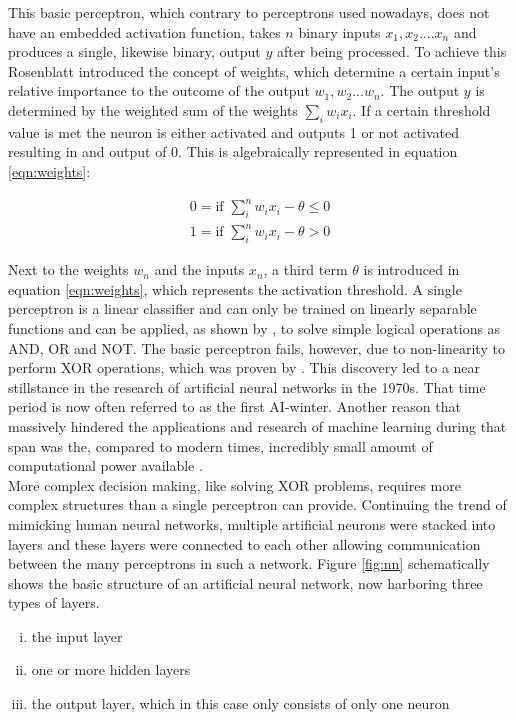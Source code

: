 This basic perceptron, which contrary to perceptrons used nowadays, does not have an
embedded activation function, takes $n$ binary inputs $x_1 , x_2 .... x_n$ and produces a
single, likewise binary, output $y$ after being processed. To achieve this Rosenblatt
introduced the concept of weights, which determine a certain input's relative importance
to the outcome of the output $w_1 , w_2 ... w_n$. The output $y$ is determined by the
weighted sum of the weights $\sum_i w_ix_i $. If a certain threshold value is met the
neuron is either activated and outputs 1 or not activated resulting in and output of
0. This is algebraically represented in equation \ref{eqn:weights}:

\begin{subequations}
 \begin{align}
  0 = \mbox{if } \sum_i^n w_i x_i - \theta \leq 0 \\
  1 = \mbox{if } \sum_i^n w_i x_i - \theta > 0
 \end{align}
 \label{eqn:weights}
\end{subequations}


Next to the weights $w_n$ and the inputs $x_n$, a third term $\theta$ is introduced in
equation \ref{eqn:weights}, which represents the activation threshold. A single perceptron
is a linear classifier and can only be trained on linearly separable functions and can be
applied, as shown by \cite{rosenblatt1961}, to solve simple logical operations as AND, OR
and NOT. The basic perceptron fails, however, due to non-linearity to perform XOR
operations, which was proven by \cite{marvin1969}. This discovery led to a near
stillstance in the research of artificial neural networks in the 1970s. That time period
is now often referred to as the first AI-winter. Another reason that massively hindered
the applications and research of machine learning during that span was the, compared to
modern times, incredibly small amount of computational power available \cite{nguyen1990truck}. \\
More complex decision making, like solving XOR problems, requires more complex structures
than a single perceptron can provide. Continuing the trend of mimicking human neural
networks, multiple artificial neurons were stacked into layers and these layers were
connected to each other allowing communication between the many perceptrons in such a
network. Figure \ref{fig:nn} schematically shows the basic structure of an artificial
neural network, now harboring three types of layers.
\begin{enumerate}[(i)]
\item the input layer
\item one or more hidden layers
\item the output layer, which in this case only consists of only one neuron
\end{enumerate}

